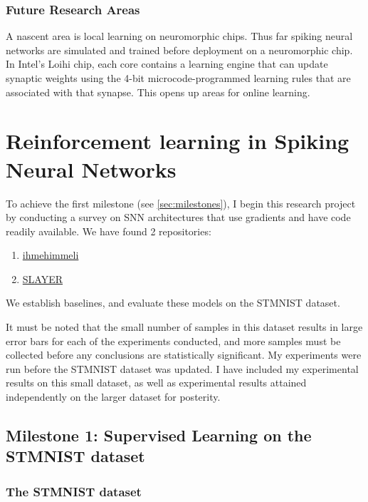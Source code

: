 \documentclass[fyp]{socreport}
\begin{document}
\subsection{Future Research Areas\label{sec:future-rese-areas}}

A nascent area is local learning on neuromorphic chips. Thus far spiking neural
networks are simulated and trained before deployment on a neuromorphic chip. In
Intel's Loihi chip, each core contains a learning engine that can update
synaptic weights using the 4-bit microcode-programmed learning rules that are
associated with that synapse. This opens up areas for online learning.

\chapter{Reinforcement learning in Spiking Neural Networks\label{cha:snnrl}}

To achieve the first milestone (see \autoref{sec:milestones}), I begin this
research project by conducting a survey on SNN architectures that use gradients
and have code readily available. We have found 2 repositories:

\begin{enumerate}
\item
\href{https://github.com/google/ihmehimmeli}{ihmehimmeli}~\cite{comsa19_tempor_codin_spikin_neural_networ}
\item
\href{https://github.com/bamsumit/slayerPytorch/}{SLAYER}~\cite{NIPS2018_7415}
\end{enumerate}

We establish baselines, and evaluate these models on the STMNIST dataset.

It must be noted that the small number of samples in this dataset results in
large error bars for each of the experiments conducted, and more samples must be
collected before any conclusions are statistically significant. My experiments
were run before the STMNIST dataset was updated. I have included my experimental
results on this small dataset, as well as experimental results attained
independently on the larger dataset for posterity.

\section{Milestone 1: Supervised Learning on the STMNIST dataset}

\subsection{The STMNIST dataset}
\end{document}
